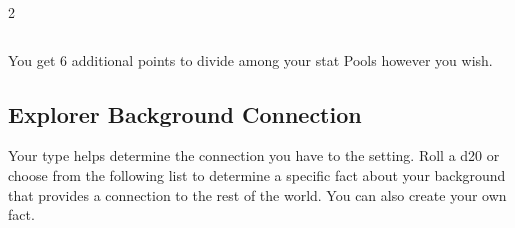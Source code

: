 \begin{multicols}{2}
\begin{table}[H]
\begin{tabularx}{\linewidth}{| X | X |}
\end{tabularx}

\end{table}

\raggedright

You get 6 additional points to divide among your stat Pools however you wish.

\subsection{Explorer Background Connection}

Your type helps determine the connection you have to the setting. Roll a d20 or choose from the following list to determine a specific fact about your background that provides a connection to the rest of the world. You can also create your own fact.

\begin{table}
\centering

\caption{Explorer Background Connection}
\label{tab:Explorer Background Connection}


\end{table}
\end{multicols}
